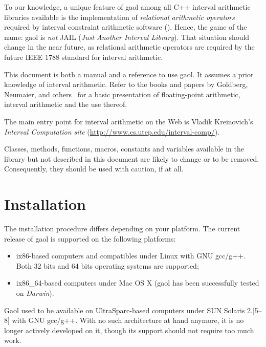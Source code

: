 \documentclass{manual}
\begin{document}
To our knowledge, a unique feature of gaol among all C++ interval
arithmetic libraries available is the implementation of
\emph{relational arithmetic operators} required by interval constraint
arithmetic software ().
%
Hence, the game of the name: gaol is \emph{not} JAIL (\emph{Just
  Another Interval Library}). That situation should change in the near future, as 
relational arithmetic operators are required by the future IEEE 1788 standard for
interval arithmetic.

This document is both a manual and a reference to use gaol. It assumes
a prior knowledge of interval arithmetic. Refer to the books and
papers by Goldberg, Neumaier, and
others~
for a basic presentation of floating-point arithmetic, interval
arithmetic and the use thereof.

The main entry point for interval arithmetic on the Web is Vladik
Kreino\-vich's \emph{Interval Computation site} (\url{http://www.cs.utep.edu/interval-comp/}).

Classes, methods, functions, macros, constants and variables available in the
library but not described in this document are likely to change or to
be removed. Consequently, they should be used with caution, if at all.
%
%

\chapter{Installation}

The installation procedure differs depending on your platform. The current release of
gaol is supported on the following platforms:

\begin{itemize}
\item ix86-based computers and compatibles under Linux with 
  GNU gcc/g++. Both 32 bits and 64 bits operating systems are supported;
\item ix86\_64-based computers under Mac OS X (gaol has been successfully tested on 
\textit{Darwin}).
\end{itemize}

\noindent Gaol used to be available on UltraSparc-based computers
under SUN Solaris 2.[5--8] with GNU gcc/g++. With no such architecture
at hand anymore, it is no longer actively developed on it, though
its support should not require too much work.
%
\end{document}
